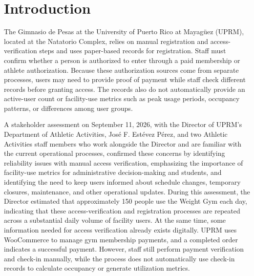 

\section{Introduction}

The Gimnasio de Pesas at the University of Puerto Rico at Mayagüez (UPRM), located at the Natatorio Complex, relies on manual registration and access-verification steps and uses paper-based records for registration. Staff must confirm whether a person is authorized to enter through a paid membership or athlete authorization. Because these authorization sources come from separate processes, users may need to provide proof of payment while staff check different records before granting access. The records also do not automatically provide an active-user count or facility-use metrics such as peak usage periods, occupancy patterns, or differences among user groups.

A stakeholder assessment on September 11, 2026, with the Director of UPRM's Department of Athletic Activities, José F. Estévez Pérez, and two Athletic Activities staff members who work alongside the Director and are familiar with the current operational processes, confirmed these concerns by identifying reliability issues with manual access verification, emphasizing the importance of facility-use metrics for administrative decision-making and students, and identifying the need to keep users informed about schedule changes, temporary closures, maintenance, and other operational updates. During this assessment, the Director estimated that approximately 150 people use the Weight Gym each day, indicating that these access-verification and registration processes are repeated across a substantial daily volume of facility users. At the same time, some information needed for access verification already exists digitally. UPRM uses WooCommerce to manage gym membership payments, and a completed order indicates a successful payment. However, staff still perform payment verification and check-in manually, while the process does not automatically use check-in records to calculate occupancy or generate utilization metrics.


